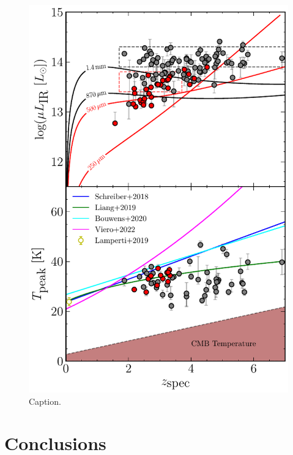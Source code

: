\begin{figure}
	\centering
	\includegraphics[width=0.75\columnwidth]{Figures/t_evolution.pdf}
	\caption{Caption.}
	\label{fig:t_evolution}
\end{figure}

\section{Conclusions}